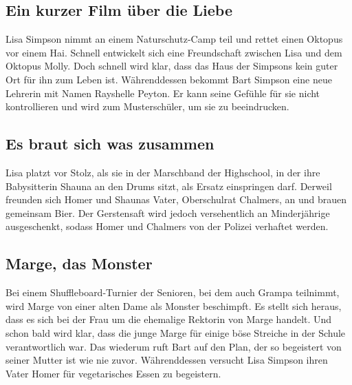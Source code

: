 
\subsection{Ein kurzer Film über die Liebe}
Lisa Simpson nimmt an einem Naturschutz-Camp teil und rettet einen Oktopus vor einem Hai. Schnell entwickelt sich eine Freundschaft zwischen Lisa und dem Oktopus Molly. Doch schnell wird klar, dass das Haus der Simpsons kein guter Ort für ihn zum Leben ist. Währenddessen bekommt Bart Simpson eine neue Lehrerin mit Namen Rayshelle Peyton. Er kann seine Gefühle für sie nicht kontrollieren und wird zum Musterschüler, um sie zu beeindrucken.


\subsection{Es braut sich was zusammen}
Lisa platzt vor Stolz, als sie in der Marschband der Highschool, in der ihre Babysitterin Shauna an den Drums sitzt, als Ersatz einspringen darf. Derweil freunden sich Homer und Shaunas Vater, Oberschulrat Chalmers, an und brauen gemeinsam Bier. Der Gerstensaft wird jedoch versehentlich an Minderjährige ausgeschenkt, sodass Homer und Chalmers von der Polizei verhaftet werden.


\subsection{Marge, das Monster}
Bei einem Shuffleboard-Turnier der Senioren, bei dem auch Grampa teilnimmt, wird Marge von einer alten Dame als Monster beschimpft. Es stellt sich heraus, dass es sich bei der Frau um die ehemalige Rektorin von Marge handelt. Und schon bald wird klar, dass die junge Marge für einige böse Streiche in der Schule verantwortlich war. Das wiederum ruft Bart auf den Plan, der so begeistert von seiner Mutter ist wie nie zuvor. Währenddessen versucht Lisa Simpson ihren Vater Homer für vegetarisches Essen zu begeistern.

